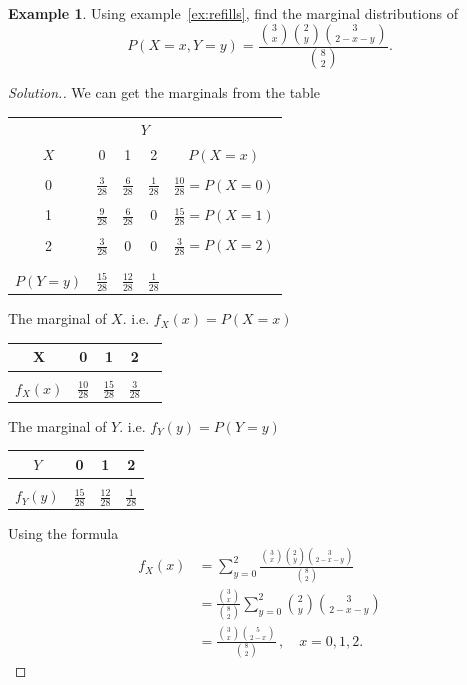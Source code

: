 \documentclass[12pt,a4paper]{report}
\theoremstyle{definition}
\newtheorem{example}[thm]{Example}
\theoremstyle{plain}
\theoremstyle{definition}
\begin{document}
\begin{example}
Using example~\ref{ex:refills}, find the marginal distributions of \[P(X=x,Y=y) =\frac{\binom{3}{x}\binom{2}{y}\binom{3}{2-x-y}}{\binom{8}{2}}.\]
\end{example}


\begin{proof}[\textit{Solution.}]
We can get the marginals from the table
\begin{table}[H]
\centering
\begin{tabular}{c|ccc|c}
 \multicolumn{5}{c}{$Y$}\\
$X$ & 0 & 1 & 2 & $P(X=x)$\\
\hline
&&&&\\
0 & $\frac{3}{28}$ & $\frac{6}{28}$ & $\frac{1}{28}$ & $\frac{10}{28}=P(X=0)$\\
&&&&\\
1 & $\frac{9}{28}$ & $\frac{6}{28}$ & 0 & $\frac{15}{28}=P(X=1)$\\
&&&&\\
2 & $\frac{3}{28}$ & 0 & 0 & $\frac{3}{28}=P(X=2)$\\
&&&&\\
\hline
&&&&\\
$P(Y=y)$ & $\frac{15}{28}$ & $\frac{12}{28}$ & $\frac{1}{28}$ &\\
\end{tabular}
\end{table}





The marginal of $X$. i.e. $f_X(x) =P(X=x)$
\begin{table}[H]
\centering
\begin{tabular}{c|cccc}
X & 0 & 1  & 2\\
\hline
&&&&\\
$f_X(x)$ & $\frac{10}{28}$ & $\frac{15}{28}$ & $\frac{3}{28}$\\
\end{tabular}
\end{table}


The marginal of $Y$. i.e.  $f_Y(y)=P(Y=y)$
\begin{table}[H]
\centering
\begin{tabular}{c|ccc}
$Y$ & 0 & 1 & 2\\
\hline
&&&\\
$f_Y(y)$ & $\frac{15}{28}$ & $\frac{12}{28}$ & $\frac{1}{28}$\\
\end{tabular}
\end{table}

Using the formula
\begin{align*}
f_X(x) & =\sum^2_{y=0}\frac{\binom{3}{x}\binom{2}{y}\binom{3}{2-x-y}}{\binom{8}{2}}\\
& =\frac{\binom{3}{x}}{\binom{8}{2}}\sum^2_{y=0}\binom{2}{y}\binom{3}{2-x-y}\\
& = \frac{\binom{3}{x}\binom{5}{2-x}}{\binom{8}{2}}\, , \quad x=0, 1, 2.
\end{align*}
\end{proof}
\end{document}
